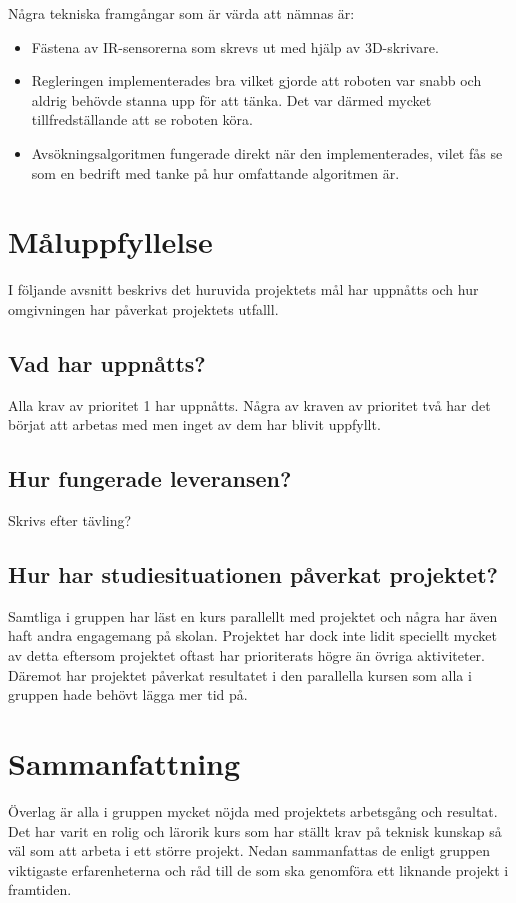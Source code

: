 \documentclass[11pt]{article}
\begin{document}
Några tekniska framgångar som är värda att nämnas är:
\begin{itemize}
\item Fästena av IR-sensorerna som skrevs ut med hjälp av 3D-skrivare.
\item Regleringen implementerades bra vilket gjorde att roboten var snabb och aldrig behövde stanna upp för att tänka. Det var därmed mycket tillfredställande att se roboten köra. 
\item Avsökningsalgoritmen fungerade direkt när den implementerades, vilet fås se som en bedrift med tanke på hur omfattande algoritmen är. 
\end{itemize} 

\section{Måluppfyllelse}
I följande avsnitt beskrivs det huruvida projektets mål har uppnåtts och hur omgivningen har påverkat projektets utfalll.

\subsection{Vad har uppnåtts?}
Alla krav av prioritet 1 har uppnåtts. Några av kraven av prioritet två har det börjat att arbetas med men inget av dem har blivit uppfyllt.

\subsection{Hur fungerade leveransen?}
Skrivs efter tävling?

\subsection{Hur har studiesituationen påverkat projektet?}
Samtliga i gruppen har läst en kurs parallellt med projektet och några har även haft andra engagemang på skolan. Projektet har dock inte lidit speciellt mycket av detta eftersom projektet oftast har prioriterats högre än övriga aktiviteter. Däremot har projektet påverkat resultatet i den parallella kursen som alla i gruppen hade behövt lägga mer tid på.  

\section{Sammanfattning}
Överlag är alla i gruppen mycket nöjda med projektets arbetsgång och resultat. Det har varit en rolig och lärorik kurs som har ställt krav på teknisk kunskap så väl som att arbeta i ett större projekt. Nedan sammanfattas de enligt gruppen viktigaste erfarenheterna och råd till de som ska genomföra ett liknande projekt i framtiden.
\end{document}
